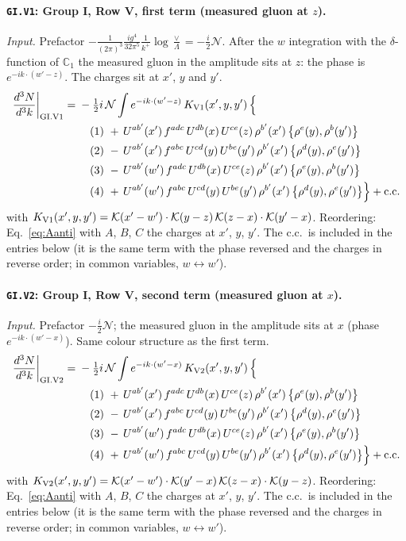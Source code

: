 \documentclass[10pt]{article}
\numberwithin{equation}{section}
\newcommand{\KK}{\mathcal K}
\newcommand{\NN}{\mathcal N}
\newcommand{\lab}[1]{\texttt{#1}}
\begin{document}
\paragraph{\lab{GI.V1}: Group I, Row V, first term (measured gluon at $z$).}
\emph{Input.} Prefactor $-\frac{1}{(2\pi)^3}\frac{ig^4}{32\pi^5}\frac1{k^+}\log\frac\vee\Lambda=-\frac i2\NN$. After the $w$ integration with the $\delta$-function of $\mathbb C_1$ the measured gluon in the amplitude sits at $z$: the phase is $e^{-ik\cdot(w'-z)}$. The charges sit at $x'$, $y$ and $y'$.
\begin{align}
\frac{d^3N}{d^3k}\bigg|_{\rm GI.V1}={}&-\tfrac12i\,\NN\int e^{-ik\cdot(w'-z)}\,K_{\rm V1}(x',y,y')\,\Big\{\notag\\
&\quad (1)\ +\,U^{ab'}(x')\,f^{adc}\,U^{db}(x)\,U^{ce}(z)\,\rho^{b'}(x')\,\big\{\rho^{e}(y),\rho^{b}(y')\big\}\notag\\
&\quad (2)\ -\,U^{ab'}(x')\,f^{abc}\,U^{cd}(y)\,U^{be}(y')\,\rho^{b'}(x')\,\big\{\rho^{d}(y),\rho^{e}(y')\big\}\notag\\
&\quad (3)\ -\,U^{ab'}(w')\,f^{adc}\,U^{db}(x)\,U^{ce}(z)\,\rho^{b'}(x')\,\big\{\rho^{e}(y),\rho^{b}(y')\big\}\notag\\
&\quad (4)\ +\,U^{ab'}(w')\,f^{abc}\,U^{cd}(y)\,U^{be}(y')\,\rho^{b'}(x')\,\big\{\rho^{d}(y),\rho^{e}(y')\big\}\Big\}+{\rm c.c.}\label{eq:in-GI.V1}
\end{align}
with $K_{\rm V1}(x',y,y')=\KK(x'-w')\cdot\KK(y-z)\,\KK(z-x)\cdot\KK(y'-x)$.
Reordering: Eq.~\eqref{eq:Aanti} with $A$, $B$, $C$ the charges at $x'$, $y$, $y'$.
The c.c.\ is included in the entries below (it is the same term with the phase reversed and the charges in reverse order; in common variables, $w\leftrightarrow w'$).
\paragraph{\lab{GI.V2}: Group I, Row V, second term (measured gluon at $x$).}
\emph{Input.} Prefactor $-\frac i2\NN$; the measured gluon in the amplitude sits at $x$ (phase $e^{-ik\cdot(w'-x)}$). Same colour structure as the first term.
\begin{align}
\frac{d^3N}{d^3k}\bigg|_{\rm GI.V2}={}&-\tfrac12i\,\NN\int e^{-ik\cdot(w'-x)}\,K_{\rm V2}(x',y,y')\,\Big\{\notag\\
&\quad (1)\ +\,U^{ab'}(x')\,f^{adc}\,U^{db}(x)\,U^{ce}(z)\,\rho^{b'}(x')\,\big\{\rho^{e}(y),\rho^{b}(y')\big\}\notag\\
&\quad (2)\ -\,U^{ab'}(x')\,f^{abc}\,U^{cd}(y)\,U^{be}(y')\,\rho^{b'}(x')\,\big\{\rho^{d}(y),\rho^{e}(y')\big\}\notag\\
&\quad (3)\ -\,U^{ab'}(w')\,f^{adc}\,U^{db}(x)\,U^{ce}(z)\,\rho^{b'}(x')\,\big\{\rho^{e}(y),\rho^{b}(y')\big\}\notag\\
&\quad (4)\ +\,U^{ab'}(w')\,f^{abc}\,U^{cd}(y)\,U^{be}(y')\,\rho^{b'}(x')\,\big\{\rho^{d}(y),\rho^{e}(y')\big\}\Big\}+{\rm c.c.}\label{eq:in-GI.V2}
\end{align}
with $K_{\rm V2}(x',y,y')=\KK(x'-w')\cdot\KK(y'-x)\,\KK(z-x)\cdot\KK(y-z)$.
Reordering: Eq.~\eqref{eq:Aanti} with $A$, $B$, $C$ the charges at $x'$, $y$, $y'$.
The c.c.\ is included in the entries below (it is the same term with the phase reversed and the charges in reverse order; in common variables, $w\leftrightarrow w'$).
\end{document}
